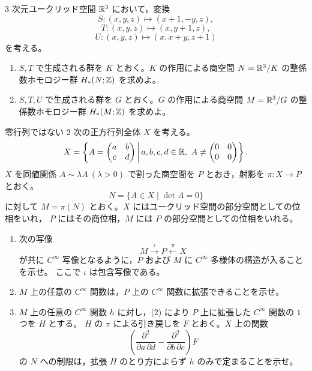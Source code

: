 
\(3\) 次元ユークリッド空間 \(\mathbb{R}^3\) において，変換
\[
  S:(x,y,z)\mapsto (x+1,-y,z),
\]
\[
  T:(x,y,z)\mapsto (x,y+1,z),
\]
\[
  U:(x,y,z)\mapsto (x,x+y,z+1)
\]
を考える。

\begin{enumerate}
  \item \(S,T\) で生成される群を \(K\) とおく。\(K\) の作用による商空間
  \(N=\mathbb{R}^3/K\) の整係数ホモロジー群 \(H_*(N;\mathbb{Z})\) を求めよ。
  \item \(S,T,U\) で生成される群を \(G\) とおく。\(G\) の作用による商空間
  \(M=\mathbb{R}^3/G\) の整係数ホモロジー群 \(H_*(M;\mathbb{Z})\) を求めよ。
\end{enumerate}


零行列ではない \(2\) 次の正方行列全体 \(X\) を考える。
\[
  X=\left\{
    A=\begin{pmatrix}a&b\\ c&d\end{pmatrix}
    \,\middle|\,
    a,b,c,d\in\R,\ 
    A\ne \begin{pmatrix}0&0\\0&0\end{pmatrix}
  \right\}.
\]
\(X\) を同値関係 \(A\sim \lambda A\ (\lambda>0)\) で割った商空間を \(P\) とおき，射影を
\(\pi:X\to P\) とおく。
\[
  N=\{A\in X\mid \det A=0\}
\]
に対して \(M=\pi(N)\) とおく。\(X\) にはユークリッド空間の部分空間としての位相をいれ，
\(P\) にはその商位相，\(M\) には \(P\) の部分空間としての位相をいれる。

\begin{enumerate}
  \item 次の写像
  \[
    M\xrightarrow{\iota}P\xleftarrow{\pi}X
  \]
  が共に \(C^\infty\) 写像となるように，\(P\) および \(M\) に \(C^\infty\) 多様体の構造が入ることを示せ。
  ここで \(\iota\) は包含写像である。
  \item \(M\) 上の任意の \(C^\infty\) 関数は，\(P\) 上の \(C^\infty\) 関数に拡張できることを示せ。
  \item \(M\) 上の任意の \(C^\infty\) 関数 \(h\) に対し，(2) により \(P\) 上に拡張した \(C^\infty\) 関数の \(1\) つを \(H\) とする。
  \(H\) の \(\pi\) による引き戻しを \(F\) とおく。\(X\) 上の関数
  \[
    \left(\frac{\partial^2}{\partial a\,\partial d}
      -\frac{\partial^2}{\partial b\,\partial c}\right)F
  \]
  の \(N\) への制限は，拡張 \(H\) のとり方によらず \(h\) のみで定まることを示せ。
\end{enumerate}

